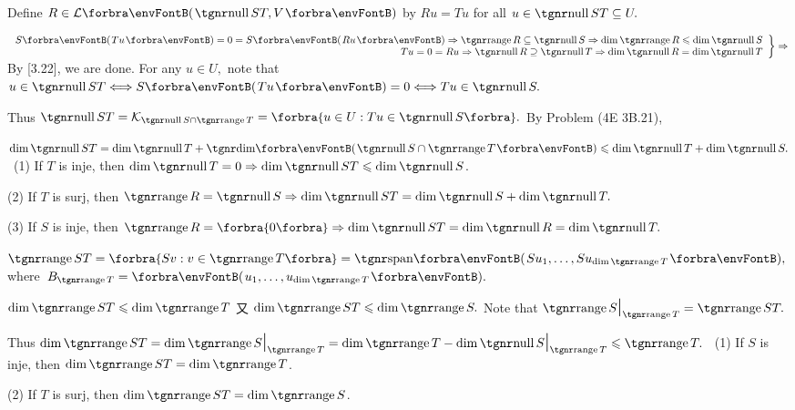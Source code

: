 \documentclass[a4paper, 11pt, UTF8]{article}
\begin{document}
\begin{large}
\par\quad
Define $R\in\Lm{\null ST,V}$ by $Ru=Tu$ for all $u\in\null ST\subseteq U.$\par\quad
$\MathRightBrace{r}{S\Par{Tu}=0=S\Par{Ru}\Rightarrow\range R\subseteq\null S\Rightarrow\dim\range R\leqslant\dim\null S\\ Tu=0=Ru\Rightarrow\null R\supseteq\null T\Rightarrow\dim\null R=\dim\null T}\Rightarrow$ By [3.22], we are done.\PfEnd[-20pt]\vspace{12pt}\quad
\Or For any $u\in U,$ note that $u\in\null ST\Longleftrightarrow S\Par{Tu}=0\Longleftrightarrow Tu\in\null S.$\par\quad
Thus $\null ST=\mathcal{K}_{\null S\cap\range T}=\Bra{u\in U:Tu\in\null S}.$ By Problem (4E 3B.21),\par\quad
$\dim\null ST=\dim\null T+\Dim\Par{\null S\cap\range T}\leqslant\dim\null T+\dim\null S.$\vspace{6pt}\PfEnd
\Corollary \,\,\,(1) If $T$ is inje, then $\dim\null T=0\Rightarrow\dim\null ST\leqslant\dim\null S$.\par\Blind{\Corollary \,\,}
(2) If $T$ is surj, then $\range R=\null S\Rightarrow\dim\null ST=\dim\null S+\dim\null T.$\par\Blind{\Corollary \,\,}
(3) If $S$ is inje, then $\range R=\zeroSubs\Rightarrow \dim\null ST=\dim\null R=\dim\null T.$
\SepLine

\par\quad
$\range ST=\Bra{Sv:v\in\range T}=\Span{Su_1,\dots,Su_{\dim\range T}},$ where \,$B_{\range T}=\Par{u_1,\dots,u_{\dim\range T}}.$\par\quad
$\dim\range ST\leqslant \dim\range T$
又 $\dim\range ST\leqslant \dim\range S.$\PfEnd\vspace{6pt}\quad
\Or Note that $\range S\mid_{\range T}=\range ST.$\par\quad
Thus $\dim\range ST=\dim\range S\mid_{\range T}=\dim\range T-\dim\null S\mid_{\range T}\leqslant \range T.$\vspace{6pt}\PfEnd
\Corollary \,\,\,(1) If $S$ is inje, then $\dim\range ST=\dim\range T$.\par\Blind{\Corollary \,\,}
(2) If $T$ is surj, then $\dim\range ST=\dim\range S$.
\SepLine


\end{large}
\end{document}

